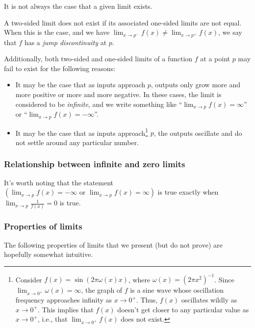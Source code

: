 It is not always the case that a given limit exists. 

A two-sided limit does not exist if its associated one-sided limits are not equal. When this is the case, and we have $\lim_{x \rightarrow p^-} f(x) \neq \lim_{x \rightarrow p^+} f(x)$, we say that $f$ has a \textit{jump discontinuity} at $p$.

Additionally, both two-sided and one-sided limits of a function $f$ at a point $p$ may fail to exist for the following reasons:

\begin{itemize}
    \item It may be the case that as inputs approach $p$, outputs only grow more and more positive or more and more negative. In these cases, the limit is considered to be \textit{infinite}, and we write something like ``$\lim_{x \rightarrow p} f(x) = \infty$'' or ``$\lim_{x \rightarrow p} f(x) = -\infty$''.
    \item It may be the case that as inputs approach\footnote{Consider $f(x) = \sin(2 \pi \omega(x) x)$, where $\omega(x) = (2 \pi x^2)^{-1}$. Since $\lim_{x \rightarrow 0^+} \omega(x) = \infty$, the graph of $f$ is a sine wave whose oscillation frequency approaches infinity as $x \rightarrow 0^+$. Thus, $f(x)$ oscillates wildly as $x \rightarrow 0^+$. This implies that $f(x)$ doesn't get closer to any particular value as $x \rightarrow 0^+$, i.e., that $\lim_{x \rightarrow 0^+} f(x)$ does not exist.} $p$, the outputs oscillate and do not settle around any particular number.
\end{itemize}

\subsubsection*{Relationship between infinite and zero limits}

It's worth noting that the statement $(\lim_{x \rightarrow p} f(x) = - \infty \text{ or } \lim_{x \rightarrow p} f(x) = \infty)$ is true exactly when $\lim_{x \rightarrow p} \frac{1}{f(x)} = 0$ is true.

\subsubsection*{Properties of limits}

The following properties of limits that we present (but do not prove) are hopefully somewhat intuitive.

\vspace{.25cm}

